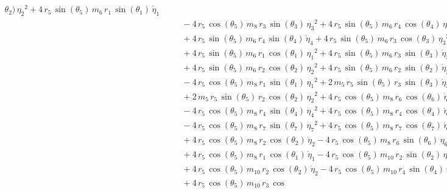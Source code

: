 \begin{eqnarray*}
{\theta_{2}})\,{{\eta_{2}}}^2 + 4\,r_{5}\,\sin({\theta_{5}})\,m_{6}\,r
_{1}\,\sin({\theta_{1}})\,{\dot{\eta}_{1}} \\ &&\quad\mbox{} - 4\,r_{5
}\,\cos({\theta_{5}})\,m_{8}\,r_{3}\,\sin({\theta_{3}})\,{{\eta_{3}}}^
2 + 4\,r_{5}\,\sin({\theta_{5}})\,m_{6}\,r_{4}\,\cos({\theta_{4}})\,{{
\eta_{4}}}^2 \\ &&\quad\mbox{} + 4\,r_{5}\,\sin({\theta_{5}})\,m_{6}\,
r_{4}\,\sin({\theta_{4}})\,{\dot{\eta}_{4}} + 4\,r_{5}\,\sin({\theta_{
5}})\,m_{6}\,r_{3}\,\cos({\theta_{3}})\,{{\eta_{3}}}^2
 \\ &&\quad\mbox{} + 4\,r_{5}\,\sin({\theta_{5}})\,m_{6}\,r_{1}\,\cos(
{\theta_{1}})\,{{\eta_{1}}}^2 + 4\,r_{5}\,\sin({\theta_{5}})\,m_{6}\,r
_{3}\,\sin({\theta_{3}})\,{\dot{\eta}_{3}} \\ &&\quad\mbox{} + 4\,r_{5
}\,\sin({\theta_{5}})\,m_{6}\,r_{2}\,\cos({\theta_{2}})\,{{\eta_{2}}}^
2 + 4\,r_{5}\,\sin({\theta_{5}})\,m_{6}\,r_{2}\,\sin({\theta_{2}})\,{
\dot{\eta}_{2}} \\ &&\quad\mbox{} - 4\,r_{5}\,\cos({\theta_{5}})\,m_{8
}\,r_{1}\,\sin({\theta_{1}})\,{{\eta_{1}}}^2 + 2\,m_{5}\,r_{5}\,\sin({
\theta_{5}})\,r_{3}\,\sin({\theta_{3}})\,{\dot{\eta}_{3}}
 \\ &&\quad\mbox{} + 2\,m_{5}\,r_{5}\,\sin({\theta_{5}})\,r_{2}\,\cos(
{\theta_{2}})\,{{\eta_{2}}}^2 + 4\,r_{5}\,\cos({\theta_{5}})\,m_{8}\,r
_{6}\,\cos({\theta_{6}})\,{\dot{\eta}_{6}} \\ &&\quad\mbox{} - 4\,r_{5
}\,\cos({\theta_{5}})\,m_{8}\,r_{4}\,\sin({\theta_{4}})\,{{\eta_{4}}}^
2 + 4\,r_{5}\,\cos({\theta_{5}})\,m_{8}\,r_{4}\,\cos({\theta_{4}})\,{
\dot{\eta}_{4}} \\ &&\quad\mbox{} - 4\,r_{5}\,\cos({\theta_{5}})\,m_{8
}\,r_{7}\,\sin({\theta_{7}})\,{{\eta_{7}}}^2 + 4\,r_{5}\,\cos({\theta
_{5}})\,m_{8}\,r_{7}\,\cos({\theta_{7}})\,{\dot{\eta}_{7}}
 \\ &&\quad\mbox{} + 4\,r_{5}\,\cos({\theta_{5}})\,m_{8}\,r_{2}\,\cos(
{\theta_{2}})\,{\dot{\eta}_{2}} - 4\,r_{5}\,\cos({\theta_{5}})\,m_{8}
\,r_{6}\,\sin({\theta_{6}})\,{{\eta_{6}}}^2 \\ &&\quad\mbox{} + 4\,r_{
5}\,\cos({\theta_{5}})\,m_{8}\,r_{1}\,\cos({\theta_{1}})\,{\dot{\eta}
_{1}} - 4\,r_{5}\,\cos({\theta_{5}})\,m_{10}\,r_{2}\,\sin({\theta_{2}}
)\,{{\eta_{2}}}^2 \\ &&\quad\mbox{} + 4\,r_{5}\,\cos({\theta_{5}})\,m
_{10}\,r_{2}\,\cos({\theta_{2}})\,{\dot{\eta}_{2}} - 4\,r_{5}\,\cos({
\theta_{5}})\,m_{10}\,r_{4}\,\sin({\theta_{4}})\,{{\eta_{4}}}^2
 \\ &&\quad\mbox{} + 4\,r_{5}\,\cos({\theta_{5}})\,m_{10}\,r_{3}\,\cos

\end{eqnarray*}
